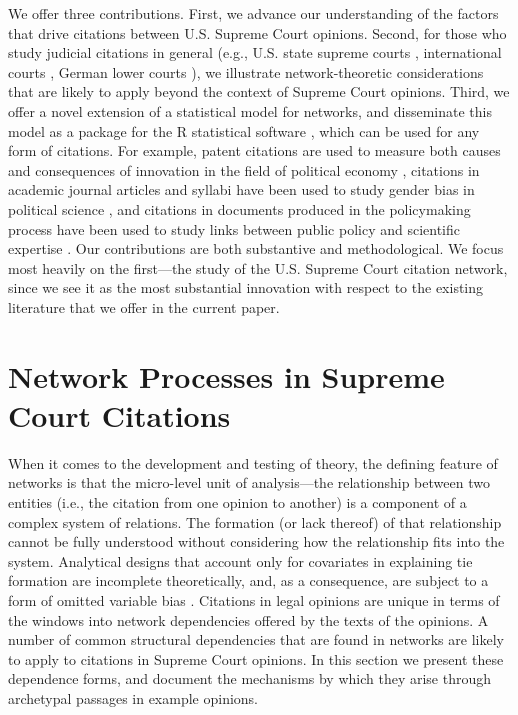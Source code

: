 \documentclass{cup-pan}
\begin{document}
We offer three contributions. First, we advance our understanding of the factors that drive citations between U.S. Supreme Court opinions. Second, for those who study judicial citations in general (e.g., U.S. state supreme courts \citep{hinkle2016transmission}, international courts \citep{lupu2012precedent},  German lower courts \citep{berlemann2020disposition}), we illustrate network-theoretic considerations that are likely to apply beyond the context of Supreme Court opinions. Third, we offer a novel extension of a statistical model for networks, and disseminate this model as a package for the R statistical software \citep{cergm}, which can be used for any form of citations. For example, patent citations are used to measure both causes and consequences of innovation in the field of political economy \citep{akcigit2018growth,dincer2019does}, citations in academic journal articles and syllabi have been used to study gender bias in political science  \citep{dion2018gendered,maliniak2013gender,hardt2019gender,atchison2017negating}, and citations in documents produced in the policymaking process have been used to study links between public policy and scientific expertise \citep{costa2016science,koontz2018use,pattyn2020knowledge}. Our contributions are both substantive and methodological. We focus most heavily on the first---the study of the U.S. Supreme Court citation network, since we see it as the most substantial innovation with respect to the existing literature that we offer in the current paper.

\section{Network Processes in Supreme Court Citations} 

When it comes to the development and testing of theory, the defining feature of networks is that the micro-level unit of analysis---the relationship between two entities (i.e., the citation from one opinion to another) is a component of a complex system of relations. The formation (or lack thereof) of that relationship cannot be fully understood without considering how the relationship fits into the system. Analytical designs that account only for covariates in explaining tie formation are incomplete theoretically, and, as a consequence, are subject to a form of omitted variable bias \citep{cranmer2016critique}. Citations in legal opinions are unique in terms of the windows into network dependencies offered by the texts of the opinions. A number of common structural dependencies that are found in networks are likely to apply to citations in Supreme Court opinions. In this section we present these dependence forms, and document the mechanisms by which they arise through archetypal passages in example opinions. 
\end{document}
